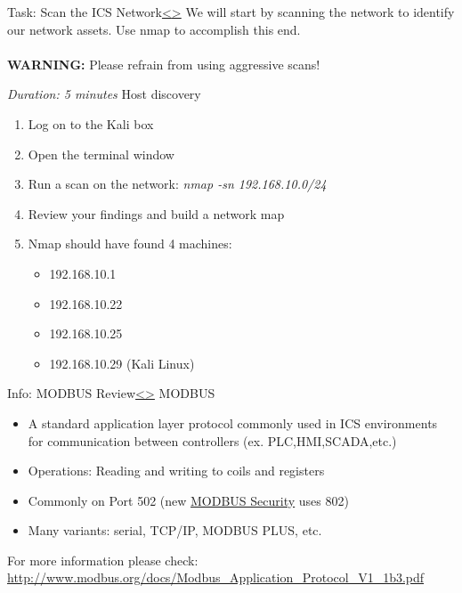 \documentclass[12pt]{extarticle}
\newenvironment{instructionblock}{\Large\bgroup}{\egroup}
\newcommand{\ben}{\begin{enumerate}}
\newcommand{\een}{\end{enumerate}}
\newcommand{\bi}{\begin{itemize}}
\newcommand{\ei}{\end{itemize}}
\newcounter{next}
\newcounter{prev}
\begin{document}
\pagebreak
{}
\begin{slide}{Task: Scan the ICS Network}{\hyperref[slide \theprev]{\textless}\hyperref[slide \thenext]{\textgreater}}
	\begin{instructionblock}
		We will start by scanning the network to identify our network assets. Use nmap to accomplish this end.\\\\
		\textbf{WARNING:} Please refrain from using aggressive scans!
 	\end{instructionblock}
\end{slide}
\textit{Duration: 5 minutes}
\vfill
\noindent
Host discovery
\ben
	\item Log on to the Kali box
	\item Open the terminal window
	\item Run a scan on the network: \textit{nmap -sn 192.168.10.0/24}
	\item Review your findings and build a network map
	\item Nmap should have found 4 machines:
	\bi
		\item 192.168.10.1
		\item 192.168.10.22
		\item 192.168.10.25
		\item 192.168.10.29 (Kali Linux)
	\ei
\een
\pagebreak


\pagebreak
{}
\begin{slide}{Info: MODBUS Review}{\hyperref[slide \theprev]{\textless}\hyperref[slide \thenext]{\textgreater}}
	\begin{instructionblock}
		MODBUS
		\bi
			\item A standard application layer protocol commonly used in ICS environments for communication between controllers (ex. PLC,HMI,SCADA,etc.)
			\item Operations: Reading and writing to coils and registers
			\item Commonly on Port 502 (new \href{modbus.org/docs/Modbus-SecurityPR-10-2018.pdf}{MODBUS Security} uses 802)
			\item Many variants: serial, TCP/IP, MODBUS PLUS, etc.
		\ei
	\end{instructionblock}
\end{slide}
\vfill
\noindent
For more information please check: \url{http://www.modbus.org/docs/Modbus_Application_Protocol_V1_1b3.pdf}
\pagebreak
\end{document}
